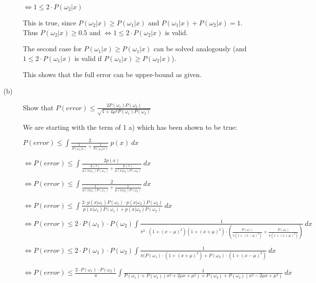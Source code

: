 \documentclass{article}
\begin{document}
\begin{description}
\vspace{0.3cm}
$\Leftrightarrow 1 \leq 2 \cdot P(\omega_2 | x)$

\vspace{0.3cm}
This is true, since $P(\omega_2 | x) \geq P(\omega_1 | x)$ and $P(\omega_1 | x) + P(\omega_2 | x) = 1$. Thus $P(\omega_2 | x) \geq 0.5$ and $\Leftrightarrow 1 \leq 2 \cdot P(\omega_2 | x)$ is valid.

\vspace{0.3cm}
The second case for $ P(\omega_1|x) \geq P(\omega_1|x)$ can be solved analogously (and 
$1 \leq 2 \cdot P(\omega_1 | x)$ is valid if $P(\omega_1 | x) \geq P(\omega_2 | x)$).

\vspace{0.3cm}
This shows that the full error can be upper-bound as given.

\item[(b)]

Show that $P(error) \leq \frac{2P(\omega_1)P(\omega_2)}{\sqrt{1 + 4 \mu^2 P(\omega_1)P(\omega_2)}}$

\vspace{0.3cm}
We are starting with the term of 1 a) which has been shown to be true:
\vspace{0.3cm}

$P(error) \leq \int \frac{2}{\frac{1}{P(\omega_1|x)} + \frac{1}{P(\omega_2|x)}}\ p(x)\ dx$
\vspace{0.3cm}

$\Leftrightarrow P(error) \leq \int \frac{2 p(x)}{\frac{p(x)}{p(x|\omega_1)P(\omega_1)} + \frac{p(x)}{p(x|\omega_2)P(\omega_2)}}\ dx$

$\Leftrightarrow P(error) \leq \int \frac{2}{\frac{1}{p(x|\omega_1)P(\omega_1)} + \frac{1}{p(x|\omega_2)P(\omega_2)}}\ dx$

$\Leftrightarrow P(error) \leq \int \frac{2 \cdot p(x|\omega_1)P(\omega_1) \cdot p(x|\omega_2)P(\omega_2)}{p(x|\omega_1)P(\omega_1) +p(x|\omega_2)P(\omega_2)}\ dx$

$\Leftrightarrow P(error) \leq 2 \cdot P(\omega_1) \cdot P(\omega_2) \int \frac{1}{\pi^2 \cdot (1+(x-\mu)^2) (1+(x+\mu)^2) \cdot (\frac{P(\omega_1)}{\pi(1+(x-\mu)^2)}+\frac{P(\omega_2)}{\pi (1 + (x+\mu)^2)})}\ dx$

$\Leftrightarrow P(error) \leq 2 \cdot P(\omega_1) \cdot P(\omega_2) \int \frac{1}{\pi (P(\omega_1) \cdot (1+(x+\mu)^2)+P(\omega_2)\cdot(1+(x-\mu)^2)}\ dx$

$\Leftrightarrow P(error) \leq \frac{2 \cdot P(\omega_1) \cdot P(\omega_2)}{\pi} \int \frac{1}{P(\omega_1) + P(\omega_1)(x^2+2\mu x+\mu^2)+P(\omega_2)+P(\omega_2)(x^2-2\mu x+\mu^2)}\ dx$


\end{description}
\end{document}
